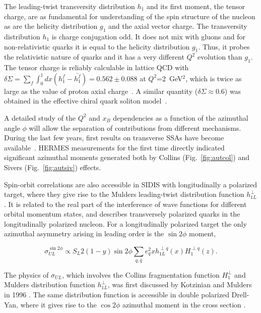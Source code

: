 The leading-twist transversity distribution $h_1$
\cite{Ralston:1979ys,Jaffe:1991ra} and its first moment, the tensor charge, 
are as fundamental for understanding of the spin structure of the nucleon as 
are the helicity distribution $g_1$  and the axial vector charge.  The 
transversity distribution  $h_1$ is charge conjugation odd.  It does not mix 
with gluons and for non-relativistic quarks it is equal to the helicity
distribution $g_1$.  Thus, it probes the relativistic nature of quarks and it 
has a very different $Q^2$ evolution than $g_1$.  The tensor charge is 
reliably calculable in lattice QCD with $\delta \Sigma = \sum_f 
\int_0^1dx(h_1^f - \bar{h_1^f})=0.562 \pm 0.088$ at $Q^2$=2~GeV$^2$, which is 
twice as large as the value of proton axial charge~\cite{Leader:1999rh}.  A 
similar quantity ($\delta \Sigma \approx 0.6$) was obtained in the effective 
chiral quark soliton model~\cite{Kim:1996vk}. 

A detailed study of the $Q^2$ and $x_B$ dependencies as a function of the 
azimuthal angle $\phi$ will allow the separation of contributions from 
different mechanisms.  During the last few years, first results on transverse 
SSAs have become available~\cite{Airapetian:2004tw,Alexakhin:2005iw}. HERMES 
measurements for the first time directly indicated significant azimuthal 
moments generated both by Collins (Fig.~\ref{fig:autcol}) and Sivers 
(Fig.~\ref{fig:autsiv}) effects.

Spin-orbit correlations are also accessible in SIDIS with longitudinally a
polarized target, where they give rise to the Mulders leading-twist 
distribution function $h_{1L}^\perp$. It is related to the real part of
the interference of wave functions for different orbital momentum states,
and describes transversely polarized quarks in the longitudinally polarized 
nucleon.  For a longitudinally polarized target the only azimuthal asymmetry
arising in leading order is the $\sin2\phi$ moment,

\begin{equation}
\sigma^{\sin2\phi}_{UL} \propto S_L 2(1-y)\sin 2\phi\sum_{q,\bar{q}} e^2_q {x h^{\perp q}_{1L}(x)} {H_1^{\perp q}(z)}.
\end{equation}

The physics of $\sigma_{UL}$, which involves the Collins fragmentation 
function $H_1^\perp$ and Mulders distribution function $h_{1L}^\perp$, 
was first discussed by Kotzinian and Mulders in 1996 
\cite{Mulders:1995dh,Kotzinian:1994dv,Kotzinian:1995cz}.  The same 
distribution function is accessible in double polarized Drell-Yan, where it 
gives rise to the $\cos2\phi$ azimuthal moment in the cross section 
\cite{Tangerman:1994eh}.

